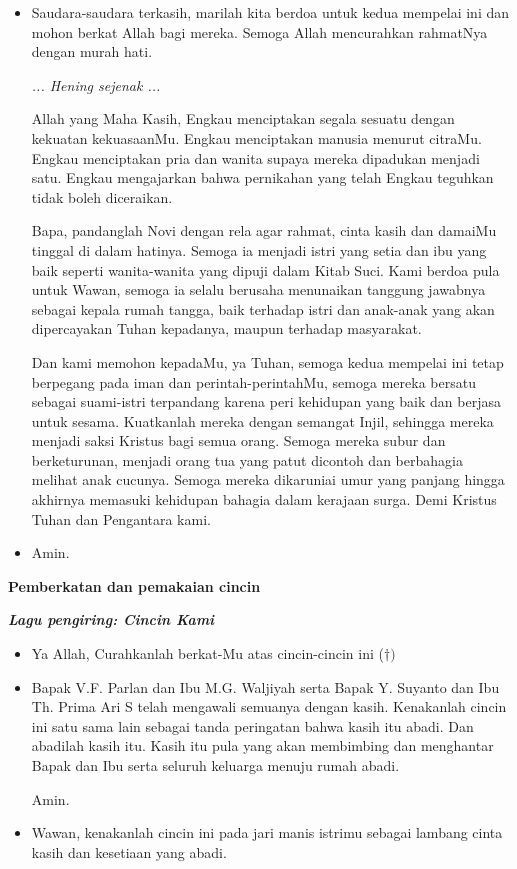 \documentclass[10pt]{book}
\makeatletter
\newcommand{\subjudul}[1]{%
  {\parindent \z@ \normalfont
    \interlinepenalty\@M \bfseries #1\par\nobreak \vskip 20\p@ }}
\newcommand{\lagu}[1]{%
  {\parindent \z@ \normalfont
    \interlinepenalty\@M \bfseries \emph{#1}\par\nobreak \vskip 20\p@ }}
\newcommand{\BU}[1]{\begin{itemize} \item[U:] #1 \end{itemize}}
\newcommand{\BI}[1]{\begin{itemize} \item[I:] #1 \end{itemize}}
\newcommand{\suami}{V.F. Parlan }
\newcommand{\istri}{M.G. Waljiyah }
\newcommand{\suamidua}{Y. Suyanto }
\newcommand{\istridua}{Th. Prima Ari S }
\makeatother
\begin{document}
\BI{Saudara-saudara terkasih, marilah kita berdoa untuk kedua mempelai ini dan mohon berkat Allah bagi mereka. Semoga Allah mencurahkan rahmatNya dengan murah hati.

		 \emph{... Hening sejenak ...}
		 
		Allah yang Maha Kasih, Engkau menciptakan segala sesuatu dengan kekuatan kekuasaanMu. Engkau menciptakan manusia menurut citraMu. Engkau menciptakan pria dan wanita supaya mereka dipadukan menjadi satu. Engkau mengajarkan bahwa pernikahan yang telah Engkau teguhkan tidak boleh diceraikan.

		Bapa, pandanglah Novi dengan rela agar rahmat, cinta kasih dan damaiMu tinggal di dalam hatinya.  Semoga ia menjadi istri yang setia dan ibu yang baik seperti wanita-wanita yang dipuji dalam Kitab Suci.
		Kami berdoa pula untuk Wawan, semoga ia selalu berusaha menunaikan tanggung jawabnya sebagai kepala rumah tangga, baik terhadap istri dan anak-anak yang akan  dipercayakan Tuhan kepadanya, maupun terhadap masyarakat.

		Dan kami memohon kepadaMu, ya Tuhan, semoga kedua mempelai ini tetap berpegang pada iman dan perintah-perintahMu, semoga mereka bersatu sebagai suami-istri terpandang karena peri kehidupan yang baik dan berjasa untuk sesama.
		Kuatkanlah mereka dengan semangat Injil, sehingga mereka menjadi saksi Kristus bagi semua orang. Semoga mereka subur dan berketurunan, menjadi orang tua yang patut dicontoh dan berbahagia melihat anak cucunya.  Semoga mereka dikaruniai umur yang panjang hingga akhirnya memasuki kehidupan bahagia dalam kerajaan surga. Demi Kristus Tuhan dan Pengantara kami.}

\BU{Amin.}

\subjudul{Pemberkatan dan pemakaian cincin}

\lagu{Lagu pengiring: Cincin Kami}

\BI{Ya Allah, Curahkanlah berkat-Mu atas cincin-cincin ini (\Large{$\dagger)$}}

\BI{Bapak \suami dan Ibu \istri serta Bapak \suamidua dan Ibu \istridua telah mengawali semuanya dengan kasih. Kenakanlah cincin ini satu sama lain sebagai tanda peringatan bahwa kasih itu abadi. Dan abadilah kasih itu. Kasih itu pula yang akan membimbing dan menghantar Bapak dan Ibu serta seluruh keluarga menuju rumah abadi.

Amin.}

\BI{Wawan, kenakanlah cincin ini pada jari manis istrimu sebagai lambang cinta kasih dan kesetiaan yang abadi.} 
\end{document}
